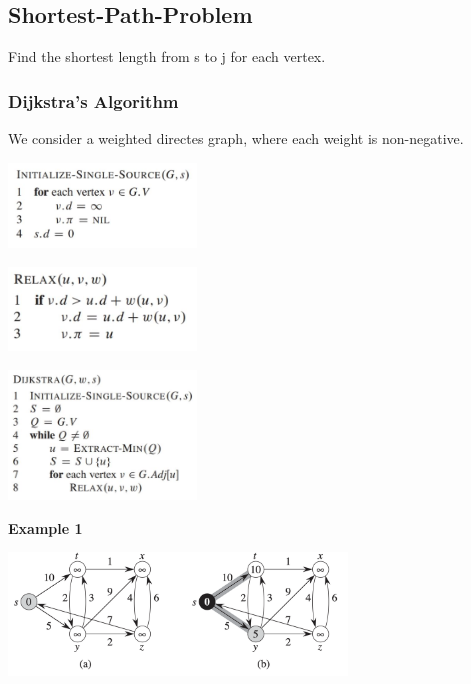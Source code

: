 \documentclass[10pt,a4paper,twocolumn]{article}
\begin{document}
\subsection{Shortest-Path-Problem}
Find the shortest length from s to j for each vertex.

\subsubsection{Dijkstra's Algorithm}
We consider a weighted directes graph, where each weight is non-negative.

\begin{center}
	\includegraphics[width=5cm]{images/init-single-source}
\end{center}

\begin{center}
	\includegraphics[width=5cm]{images/relax}
\end{center}

\begin{center}
	\includegraphics[width=5cm]{images/dijkstra}
\end{center}


\textbf{Example 1}
\begin{center}
	\includegraphics[width=9cm]{images/dijkstra-example_1}
\end{center}
\end{document}
